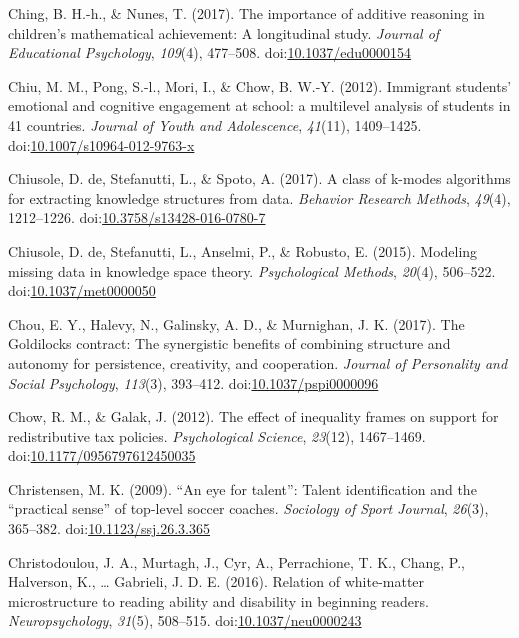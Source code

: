 \documentclass[english,man]{apa6}
\theoremstyle{definition}
\theoremstyle{definition}
\theoremstyle{definition}
\theoremstyle{remark}
\begin{document}
\hypertarget{ref-Ching2017a}{}
Ching, B. H.-h., \& Nunes, T. (2017). The importance of additive
reasoning in children's mathematical achievement: A longitudinal study.
\emph{Journal of Educational Psychology}, \emph{109}(4), 477--508.
doi:\href{https://doi.org/10.1037/edu0000154}{10.1037/edu0000154}

\hypertarget{ref-Chiu2012}{}
Chiu, M. M., Pong, S.-l., Mori, I., \& Chow, B. W.-Y. (2012). Immigrant
students' emotional and cognitive engagement at school: a multilevel
analysis of students in 41 countries. \emph{Journal of Youth and
Adolescence}, \emph{41}(11), 1409--1425.
doi:\href{https://doi.org/10.1007/s10964-012-9763-x}{10.1007/s10964-012-9763-x}

\hypertarget{ref-DeChiusole2016}{}
Chiusole, D. de, Stefanutti, L., \& Spoto, A. (2017). A class of k-modes
algorithms for extracting knowledge structures from data. \emph{Behavior
Research Methods}, \emph{49}(4), 1212--1226.
doi:\href{https://doi.org/10.3758/s13428-016-0780-7}{10.3758/s13428-016-0780-7}

\hypertarget{ref-Chiusole2015}{}
Chiusole, D. de, Stefanutti, L., Anselmi, P., \& Robusto, E. (2015).
Modeling missing data in knowledge space theory. \emph{Psychological
Methods}, \emph{20}(4), 506--522.
doi:\href{https://doi.org/10.1037/met0000050}{10.1037/met0000050}

\hypertarget{ref-Chou2017}{}
Chou, E. Y., Halevy, N., Galinsky, A. D., \& Murnighan, J. K. (2017).
The Goldilocks contract: The synergistic benefits of combining structure
and autonomy for persistence, creativity, and cooperation. \emph{Journal
of Personality and Social Psychology}, \emph{113}(3), 393--412.
doi:\href{https://doi.org/10.1037/pspi0000096}{10.1037/pspi0000096}

\hypertarget{ref-Chow2012}{}
Chow, R. M., \& Galak, J. (2012). The effect of inequality frames on
support for redistributive tax policies. \emph{Psychological Science},
\emph{23}(12), 1467--1469.
doi:\href{https://doi.org/10.1177/0956797612450035}{10.1177/0956797612450035}

\hypertarget{ref-Christensen2009}{}
Christensen, M. K. (2009). ``An eye for talent'': Talent identification
and the ``practical sense'' of top-level soccer coaches. \emph{Sociology
of Sport Journal}, \emph{26}(3), 365--382.
doi:\href{https://doi.org/10.1123/ssj.26.3.365}{10.1123/ssj.26.3.365}

\hypertarget{ref-Christodoulou2016}{}
Christodoulou, J. A., Murtagh, J., Cyr, A., Perrachione, T. K., Chang,
P., Halverson, K., \ldots{} Gabrieli, J. D. E. (2016). Relation of
white-matter microstructure to reading ability and disability in
beginning readers. \emph{Neuropsychology}, \emph{31}(5), 508--515.
doi:\href{https://doi.org/10.1037/neu0000243}{10.1037/neu0000243}
\end{document}
